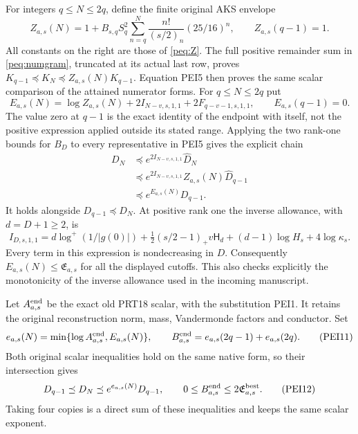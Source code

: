 \documentclass[11pt,a4paper]{article}
\begin{document}
For integers $q\le N\le2q$, define the finite original AKS envelope
\[
 Z_{a,s}(N)=1+B_{s,q}S_q^2
             \sum_{n=q}^{N}\frac{n!}{(s/2)_n}(25/16)^n,
 \qquad Z_{a,s}(q-1)=1.                                         \tag{PEI7}
\]
All constants on the right are those of \eqref{peq:Z}. The full
positive remainder sum in \eqref{peq:numgram}, truncated at its actual
last row, proves
$K_{q-1}\preceq K_N\preceq Z_{a,s}(N)K_{q-1}$.
Equation PEI5 then proves the same scalar comparison of the attained
numerator forms. For $q\le N\le2q$ put
\[
 E_{a,s}(N)=\log Z_{a,s}(N)
           +2I_{N-v,s,1,1}+2F_{q-v-1,s,1,1},
 \qquad E_{a,s}(q-1)=0.                                        \tag{PEI8}
\]
The value zero at $q-1$ is the exact identity of the endpoint with
itself, not the positive expression applied outside its stated range.
Applying the two rank-one bounds for $B_D$ to every representative
in PEI5 gives the explicit chain
\[
 \begin{split}
 D_N&\preceq e^{2I_{N-v,s,1,1}}\widehat D_N\\
    &\preceq e^{2I_{N-v,s,1,1}}Z_{a,s}(N)\widehat D_{q-1}\\
    &\preceq e^{E_{a,s}(N)}D_{q-1}.
 \end{split}                                                     \tag{PEI9}
\]
It holds alongside $D_{q-1}\preceq D_N$.
At positive rank one the inverse allowance, with $d=D+1\ge2$, is
\[
 I_{D,s,1,1}
 =d\log^+(1/|g(0)|)
  +\tfrac12(s/2-1)_+v\mathsf H_d
  +(d-1)\log H_s+4\log\kappa_s.
                                                               \tag{PEI10}
\]
Every term in this expression is nondecreasing in $D$.
Consequently $E_{a,s}(N)\le\mathfrak E_{a,s}$ for all the displayed
cutoffs. This also checks explicitly the monotonicity of the inverse
allowance used in the incoming manuscript.

Let $A^{\rm end}_{a,s}$ be the exact old PRT18 scalar, with the
substitution PEI1. It retains the original reconstruction norm, mass,
Vandermonde factors and conductor. Set
\[
 e_{a,s}(N)=\min\{\log A^{\rm end}_{a,s},E_{a,s}(N)\},\qquad
 B^{\rm end}_{a,s}=e_{a,s}(2q-1)+e_{a,s}(2q).
                                                               \tag{PEI11}
\]
Both original scalar inequalities hold on the same native form, so
their intersection gives
\[
 D_{q-1}\preceq D_N\preceq e^{e_{a,s}(N)}D_{q-1},
 \qquad
 0\le B^{\rm end}_{a,s}\le2\mathfrak E^{\rm best}_{a,s}.
                                                               \tag{PEI12}
\]
Taking four copies is a direct sum of these inequalities and keeps
the same scalar exponent.
\end{document}
